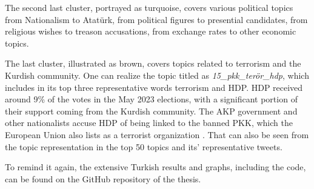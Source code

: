 The second last cluster, portrayed as turquoise, covers various political topics from Nationalism 
to Atatürk, from political figures to presential candidates, from religious wishes to treason 
accusations, from exchange rates to other economic topics. 

The last cluster, illustrated as brown, covers topics related to terrorism and the 
Kurdish community. One can realize the topic titled as \textit{15\_pkk\_terör\_hdp}, which includes 
in its top three representative words terrorism and \ac{HDP}. \ac{HDP} received around 9\% of 
the votes in the May 2023 elections, with a significant portion of their support coming 
from the Kurdish community. The AKP government and other nationalists accuse HDP of being 
linked to the banned \ac{PKK}, which the European Union also lists as a ter­ror­ist organization 
\parencite{berk_esen_opposition_alliance_2023}. That can also be seen from the topic representation
in the top 50 topics and its' representative tweets.

To remind it again, the extensive Turkish results and graphs, including the code, can be found 
on the GitHub repository of the thesis.





